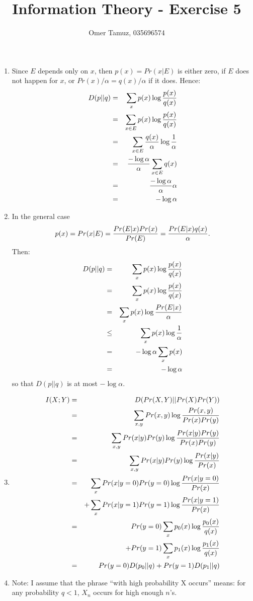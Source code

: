 \documentclass[11pt]{article} \usepackage{amssymb}
\begin{document}
\title{Information Theory - Exercise 5}

 \author{Omer Tamuz, 035696574}
\maketitle


\begin{enumerate}
\item
Since $E$ depends only on $x$, then $p(x)=Pr(x|E)$ is either zero, if $E$
does not happen for $x$, or $Pr(x)/\alpha=q(x)/\alpha$ if it does. Hence:
  \begin{eqnarray*}
    D(p||q) &=& \sum_xp(x)\log{p(x)\over q(x)}
    \\ &=& \sum_{x\in E}p(x)\log{p(x)\over q(x)}
    \\ &=& \sum_{x\in E}{q(x)\over \alpha}\log{1\over \alpha}
    \\ &=& {-\log \alpha \over \alpha}\sum_{x\in E}q(x)
    \\ &=& {-\log \alpha \over \alpha}\alpha
    \\ &=& -\log \alpha
  \end{eqnarray*}

\item
In the general case
\begin{equation*}
 p(x)=Pr(x|E)={Pr(E|x)Pr(x)\over Pr(E)}={Pr(E|x)q(x)\over \alpha}. 
\end{equation*}
Then:
  \begin{eqnarray*}
    D(p||q) &=& \sum_xp(x)\log{p(x)\over q(x)}
    \\ &=& \sum_xp(x)\log{p(x)\over q(x)}
    \\ &=& \sum_xp(x)\log{Pr(E|x)\over \alpha}
    \\ &\leq& \sum_xp(x)\log{1\over \alpha}
    \\ &=& -\log\alpha\sum_xp(x)
    \\ &=& -\log\alpha
  \end{eqnarray*}
so that $D(p||q)$ is at most $-\log \alpha$.

\item
  \begin{eqnarray*}
    I(X;Y)&=&D(Pr(X,Y)||Pr(X)Pr(Y))
    \\ &=& \sum_{x,y}Pr(x,y)\log{Pr(x,y)\over Pr(x)Pr(y)}
    \\ &=& \sum_{x,y}Pr(x|y)Pr(y)\log{Pr(x|y)Pr(y)\over Pr(x)Pr(y)}
    \\ &=& \sum_{x,y}Pr(x|y)Pr(y)\log{Pr(x|y)\over Pr(x)}
    \\ &=& \sum_xPr(x|y=0)Pr(y=0)\log{Pr(x|y=0)\over Pr(x)}
    \\ &&+\sum_xPr(x|y=1)Pr(y=1)\log{Pr(x|y=1)\over Pr(x)}
    \\ &=& Pr(y=0)\sum_xp_0(x)\log{p_0(x)\over q(x)}
    \\ &&+Pr(y=1)\sum_xp_1(x)\log{p_1(x)\over q(x)}
    \\ &=&Pr(y=0)D(p_0||q)+Pr(y=1)D(p_1||q)
  \end{eqnarray*}
\item
  Note: I assume that the phrase ``with high probability X occurs'' means: for 
  any probability $q<1$, $X_n$ occurs for high enough $n$'s. 
      

\end{enumerate}
\end{document}
